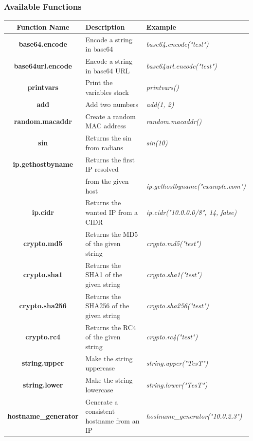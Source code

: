 \documentclass[10pt]{article}
\begin{document}
\subsubsection{Available Functions}
\hspace*{-3cm}\begin{tabular}{|c|l|l|}
  \hline
  \textbf{Function Name} & \textbf{Description} & \textbf{Example} \\
  \hline
  \hline
  \textbf{base64.encode} & Encode a string in base64 & \textit{base64.encode("test")}\\
  \hline
  \textbf{base64url.encode} & Encode a string in base64 URL & \textit{base64url.encode("test")}\\
  \hline
  \textbf{printvars} & Print the variables stack & \textit{printvars()}\\
  \hline
  \textbf{add} & Add two numbers & \textit{add(1, 2)}\\
  \hline
  \textbf{random.macaddr} & Create a random MAC address & \textit{random.macaddr()}\\
  \hline
  \textbf{sin} & Returns the sin from radians & \textit{sin(10)}\\
  \hline
  \textbf{ip.gethostbyname} & Returns the first IP resolved & \\
  & from the given host & \textit{ip.gethostbyname("example.com")}\\
  \hline
  \textbf{ip.cidr} & Returns the wanted IP from a CIDR & \textit{ip.cidr("10.0.0.0/8", 14, false)}\\
  \hline
  \textbf{crypto.md5} & Returns the MD5 of the given string & \textit{crypto.md5("test")}\\
  \hline
  \textbf{crypto.sha1} & Returns the SHA1 of the given string & \textit{crypto.sha1("test")}\\
  \hline
  \textbf{crypto.sha256} & Returns the SHA256 of the given string & \textit{crypto.sha256("test")}\\
  \hline
  \textbf{crypto.rc4} & Returns the RC4 of the given string & \textit{crypto.rc4("test")}\\
  \hline
  \textbf{string.upper} & Make the string uppercase & \textit{string.upper("TesT")}\\
  \hline
  \textbf{string.lower} & Make the string lowercase & \textit{string.lower("TesT")}\\
  \hline
  \textbf{hostname\_generator} & Generate a consistent hostname from an IP & \textit{hostname\_generator("10.0.2.3")}\\
  \hline

\end{tabular}
\end{document}
